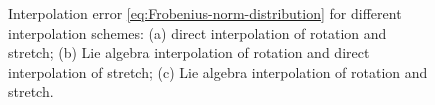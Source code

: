 \documentclass[12pt]{article}
\begin{document}
\begin{figure}[htbp]
  \begin{center}
    \unitlength=1.0mm
    \caption{Interpolation error \eqref{eq:Frobenius-norm-distribution}
      for different interpolation schemes: (a) direct interpolation of
      rotation and stretch; (b) Lie algebra interpolation of rotation
      and direct interpolation of stretch; (c) Lie algebra
      interpolation of rotation and stretch.}
    \label{fig:example-ring}
  \end{center}
\end{figure}
\end{document}
